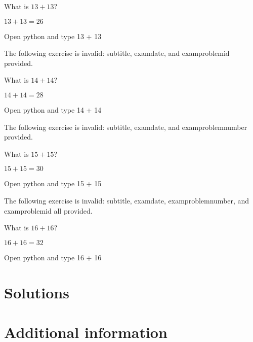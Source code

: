 \documentclass{book}
\begin{document}
\begin{exercise}[subtitle={Simple Addition}, examproblemnumber={13}, examproblemid={2020-01-15-13}]
  What is \(13 + 13\)?
\end{exercise}
\begin{solution}
  \(13 + 13 = 26\)
\end{solution}
\begin{additionalinformation}
Open python and type 13 + 13
\end{additionalinformation}

The following exercise is invalid: subtitle, examdate, and examproblemid provided.

\begin{exercise}[subtitle={Simple Addition}, examdate={January 15, 2020}, examproblemid={2020-01-15-14}]
  What is \(14 + 14\)?
\end{exercise}
\begin{solution}
  \(14 + 14 = 28\)
\end{solution}
\begin{additionalinformation}
Open python and type 14 + 14
\end{additionalinformation}

The following exercise is invalid: subtitle, examdate, and examproblemnumber provided.

\begin{exercise}[subtitle={Simple Addition}, examdate={January 15, 2020}, examproblemnumber={15}]
  What is \(15 + 15\)?
\end{exercise}
\begin{solution}
  \(15 + 15 = 30\)
\end{solution}
\begin{additionalinformation}
Open python and type 15 + 15
\end{additionalinformation}

The following exercise is invalid: subtitle, examdate, examproblemnumber, and examproblemid all provided.

\begin{exercise}[subtitle={Simple Addition}, examdate={January 15, 2020}, examproblemnumber={16}, examproblemid={2020-01-15-16}]
  What is \(16 + 16\)?
\end{exercise}
\begin{solution}
  \(16 + 16 = 32\)
\end{solution}
\begin{additionalinformation}
Open python and type 16 + 16
\end{additionalinformation}

\chapter{Solutions}

\chapter{Additional information}
\end{document}
